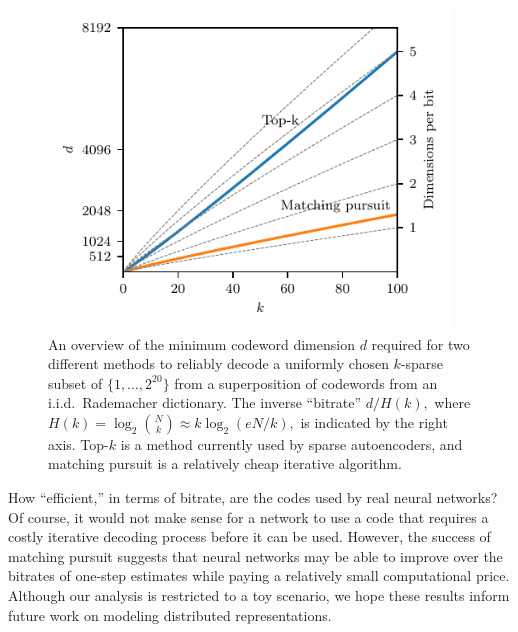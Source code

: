 \begin{figure}
	\begin{center}
	\begin{minipage}[]{0.63\textwidth}
		\includegraphics[width=0.95\textwidth]{../figures/storyline}
	\end{minipage}%
	\begin{minipage}[]{0.37\textwidth}
		\vspace{-29pt}\caption{An overview of the minimum codeword dimension $d$ required for two different methods to reliably decode a uniformly chosen $k$-sparse subset of $\{1, \dots, 2^{20} \}$ from a superposition of codewords from an i.i.d.\ Rademacher dictionary. The inverse ``bitrate'' $d/H(k),$ where $H(k) = \log_2 \binom N k \approx k \log_2(e N/k),$ is indicated by the right axis. Top-$k$ is a method currently used by sparse autoencoders, and matching pursuit is a relatively cheap iterative algorithm.}
		\label{fig:storyline}
	\end{minipage}
	\end{center}
\end{figure}

How ``efficient,'' in terms of bitrate, are the codes used by real neural networks? Of course, it would not make sense for a network to use a code that requires a costly iterative decoding process before it can be used. However, the success of matching pursuit suggests that neural networks may be able to improve over the bitrates of one-step estimates while paying a relatively small computational price. Although our analysis is restricted to a toy scenario, we hope these results inform future work on modeling distributed representations.

